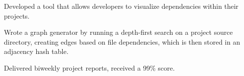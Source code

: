 \begin{cvitemize}
\item Developed a tool that allows developers to visualize dependencies within their projects.
\item Wrote a graph generator by running a depth-first search on a project source directory, creating edges based on file dependencies, which is then stored in an adjacency hash table.
\item Delivered biweekly project reports, received a 99\% score.
\end{cvitemize}